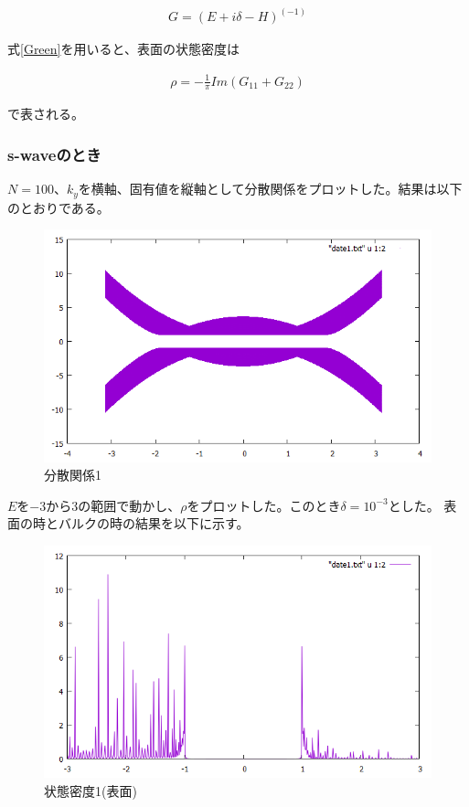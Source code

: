 \documentclass{jsarticle}
\begin{document}
            \begin{align}
                G=(E+i\delta-H)^(-1)
                \label{Green}
            \end{align}

            式\eqref{Green}を用いると、表面の状態密度は
    
            \begin{align}
                \rho=-\frac{1}{\pi}Im(G_{11}+G_{22})
            \end{align}
    
            で表される。

            \subsubsection{s-waveのとき}
            $N=100$、$k_y$を横軸、固有値を縦軸として分散関係をプロットした。結果は以下のとおりである。
    
            \begin{figure}[H]
                \centering
                \includegraphics[scale=0.5]{BdG_bry.png}
                \caption{分散関係1}
                \label{Dispersion1}
            \end{figure}
    
            $E$を$-3$から$3$の範囲で動かし、$\rho$をプロットした。このとき$\delta=10^{-3}$とした。
            表面の時とバルクの時の結果を以下に示す。
    
            \begin{figure}[H]
                \centering
                \includegraphics[scale=0.5]{LDOS_bry.png}
                \caption{状態密度1(表面)}
                \label{LDOS1}
            \end{figure}
\end{document}
